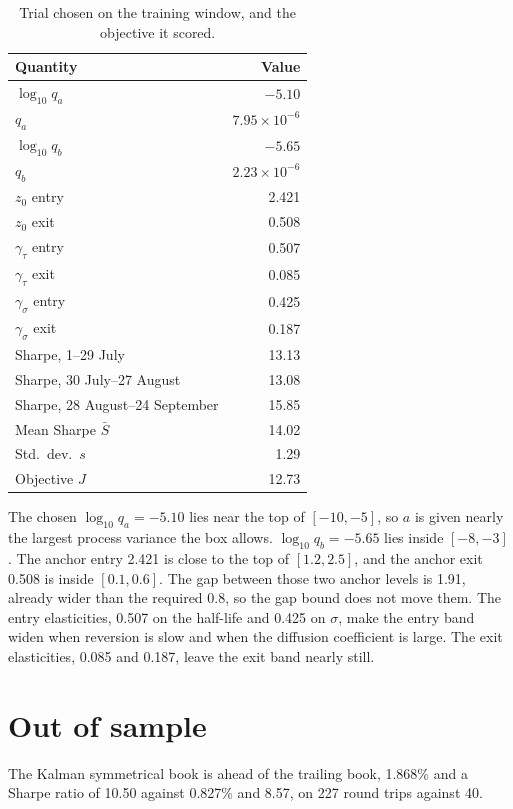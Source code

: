 \documentclass[11pt]{article}
\begin{document}
\begin{table}[ht]
\centering
\caption{Trial chosen on the training window, and the objective it scored.}
\label{tab:chosen}
\begin{tabular}{lr}
\toprule
Quantity & Value \\
\midrule
$\log_{10} q_a$ & $-5.10$ \\
$q_a$ & $7.95\times 10^{-6}$ \\
$\log_{10} q_b$ & $-5.65$ \\
$q_b$ & $2.23\times 10^{-6}$ \\
$z_0$ entry & 2.421 \\
$z_0$ exit & 0.508 \\
$\gamma_\tau$ entry & 0.507 \\
$\gamma_\tau$ exit & 0.085 \\
$\gamma_\sigma$ entry & 0.425 \\
$\gamma_\sigma$ exit & 0.187 \\
\midrule
Sharpe, 1--29 July & 13.13 \\
Sharpe, 30 July--27 August & 13.08 \\
Sharpe, 28 August--24 September & 15.85 \\
Mean Sharpe $\bar S$ & 14.02 \\
Std.\ dev.\ $s$ & 1.29 \\
Objective $J$ & 12.73 \\
\bottomrule
\end{tabular}
\end{table}

The chosen $\log_{10} q_a = -5.10$ lies near the top of $[-10, -5]$, so $a$ is given nearly the largest process variance the box allows. $\log_{10} q_b = -5.65$ lies inside $[-8, -3]$. The anchor entry 2.421 is close to the top of $[1.2, 2.5]$, and the anchor exit 0.508 is inside $[0.1, 0.6]$. The gap between those two anchor levels is 1.91, already wider than the required 0.8, so the gap bound does not move them. The entry elasticities, 0.507 on the half-life and 0.425 on $\sigma$, make the entry band widen when reversion is slow and when the diffusion coefficient is large. The exit elasticities, 0.085 and 0.187, leave the exit band nearly still.

\section{Out of sample}

The Kalman symmetrical book is ahead of the trailing book, 1.868\% and a Sharpe ratio of 10.50 against 0.827\% and 8.57, on 227 round trips against 40.
\end{document}
